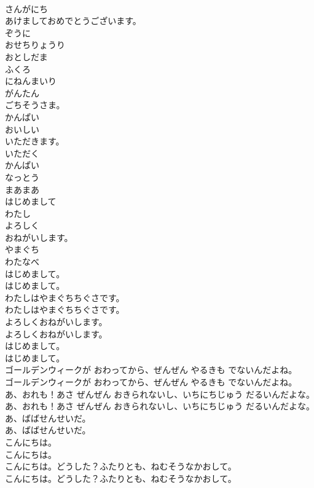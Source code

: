 \documentclass[8pt]{extreport}
\begin{document}
\begin{CJK}{UTF8}{min}
\\	さんがにち
\\	あけましておめでとうございます。
\\	ぞうに
\\	おせちりょうり
\\	おとしだま
\\	ふくろ
\\	にねんまいり
\\	がんたん
\\	ごちそうさま。
\\	かんぱい
\\	おいしい
\\	いただきます。
\\	いただく
\\	かんぱい
\\	なっとう
\\	まあまあ
\\	はじめまして
\\	わたし
\\	よろしく
\\	おねがいします。
\\	やまぐち
\\	わたなべ
\\	はじめまして。	
\\	はじめまして。 
\\	わたしはやまぐちちぐさです。	
\\	わたしはやまぐちちぐさです。 
\\	よろしくおねがいします。	
\\	よろしくおねがいします。 
\\	はじめまして。	
\\	はじめまして。 
\\	ゴールデンウィークが おわってから、ぜんぜん やるきも でないんだよね。	
\\	ゴールデンウィークが おわってから、ぜんぜん やるきも でないんだよね。 
\\	あ、おれも！あさ ぜんぜん おきられないし、いちにちじゅう だるいんだよな。	
\\	あ、おれも！あさ ぜんぜん おきられないし、いちにちじゅう だるいんだよな。 
\\	あ、ばばせんせいだ。	
\\	あ、ばばせんせいだ。 
\\	こんにちは。	
\\	こんにちは。 
\\	こんにちは。どうした？ふたりとも、ねむそうなかおして。	
\\	こんにちは。どうした？ふたりとも、ねむそうなかおして。 

\end{CJK}
\end{document}
